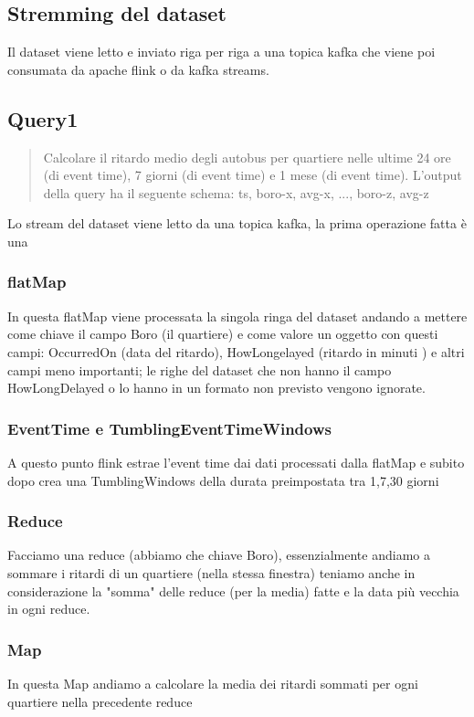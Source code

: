 \documentclass[acmsmall]{acmart}
\begin{document}
\subsection{Stremming del dataset}
Il dataset viene letto e inviato riga per riga a una topica kafka che viene poi consumata da apache flink o da kafka streams.

\subsection{Query1}
\begin{quote}
Calcolare il ritardo medio degli autobus per quartiere nelle ultime 24 ore (di event time), 7 giorni (di
event time) e 1 mese (di event time). L’output della query ha il seguente schema: ts, boro-x, avg-x, ..., boro-z, avg-z
\end{quote}

Lo stream del dataset viene letto da una topica kafka, la prima operazione fatta 
è una 
\subsubsection{flatMap} 
In questa flatMap viene processata la singola ringa del dataset andando a mettere come chiave il campo Boro (il quartiere) e come valore un oggetto con questi campi: OccurredOn (data del ritardo), HowLongelayed (ritardo in minuti ) e altri campi meno importanti;
le righe del dataset che non hanno il campo HowLongDelayed o lo hanno in un formato non previsto vengono ignorate.
\subsubsection{EventTime e TumblingEventTimeWindows}
A questo punto flink estrae l'event time dai dati processati dalla flatMap e 
subito dopo crea una TumblingWindows della durata preimpostata tra 1,7,30 giorni

\subsubsection{Reduce}
Facciamo una reduce (abbiamo che chiave Boro), essenzialmente andiamo a sommare i ritardi di un quartiere (nella stessa finestra) 
teniamo anche in considerazione la "somma" delle reduce (per la media) fatte e la data più vecchia in ogni reduce.

\subsubsection{Map}
In questa Map andiamo a calcolare la media dei ritardi sommati per ogni quartiere nella precedente reduce
\end{document}

